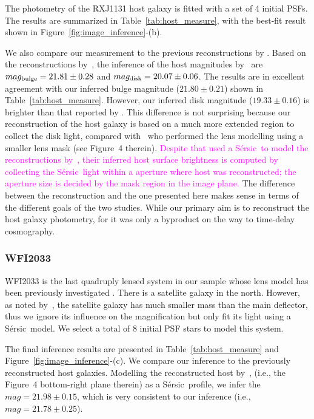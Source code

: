 \documentclass[fleqn,usenatbib]{mnras}
\newcommand{\sersic}{S\'ersic}
\newcommand{\pink}[1]{{\textcolor{magenta}{#1}}}
\begin{document}
The photometry of the RXJ1131 host galaxy is fitted with a set of 4 initial PSFs. The results are summarized in Table~\ref{tab:host_measure}, with the best-fit result shown in Figure~\ref{fig:image_inference}-(b).

We also compare our measurement to the previous reconstructions by \citet{Ding2017b}. Based on the reconstructions by~\citet{Suyu2013}, the inference of the host magnitudes by~\citet{Ding2017b} are $mag_{\rm bulge} = 21.81 \pm 0.28$ and $mag_{\rm disk} = 20.07\pm0.06$. The results are in excellent agreement with our inferred bulge magnitude ($21.80\pm0.21$)   shown in Table~\ref{tab:host_measure}. However, our inferred disk magnitude ($19.33\pm0.16$) is brighter than that reported by \citet{Ding2017b}. This difference is not surprising because our reconstruction of the host galaxy is based on a much more extended region to collect the disk light, compared with~\citet{Suyu2013} who performed the lens modelling using a smaller lens mask (see Figure~4 therein). \pink{Despite that \citet{Ding2017b} used a \sersic\ to model the reconstructions by~\citet{Suyu2013}, their inferred host surface brightness is computed by collecting the \sersic\ light within a aperture where host was reconstructed; the aperture size is decided by the mask region in the image plane.} The difference between the \citet{Suyu2013} reconstruction and the one presented here makes sense in terms of the different goals of the two studies. While our primary aim is to reconstruct the host galaxy photometry, for \citet{Suyu2013} it was only a byproduct on the way to time-delay cosmography.

\subsubsection{WFI2033}
WFI2033 is the last quadruply lensed system in our sample whose lens model has been previously investigated \citep{Rusu2019}. There is a satellite galaxy in the north. However, as noted by~\citet{Rusu2019}, the satellite galaxy has much smaller mass than the main deflector, thus we ignore its influence on the magnification but only fit its light using a \sersic\ model. We select a total of 8 initial PSF stars to model this system.

The final inference results are presented in Table~\ref{tab:host_measure} and Figure~\ref{fig:image_inference}-(c). We compare our inference to the previously reconstructed host galaxies. Modelling the reconstructed host by~\citet{Rusu2019}, (i.e., the Figure~4 bottom-right plane therein) as a \sersic\ profile, we infer the $mag = 21.98 \pm 0.15$, which is very consistent to our inference (i.e., $mag = 21.78 \pm 0.25$).
\end{document}

